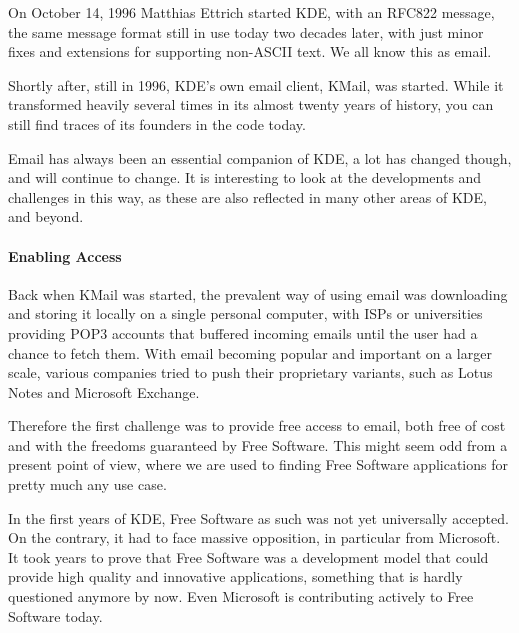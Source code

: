 

On October 14, 1996 Matthias Ettrich started KDE, with an RFC822 message, the same message format still in use today two decades later, with just minor fixes and extensions for supporting non-ASCII text. We all know this as email.

Shortly after, still in 1996, KDE's own email client, KMail, was started. While it transformed heavily several times in its almost twenty years of history, you can still find traces of its founders in the code today.

Email has always been an essential companion of KDE, a lot has changed though, and will continue to change. It is interesting to look at the developments and challenges in this way, as these are also reflected in many other areas of KDE, and beyond.

\paragraph{Enabling Access}

Back when KMail was started, the prevalent way of using email was downloading and storing it locally on a single personal computer, with ISPs or universities providing POP3 accounts that buffered incoming emails until the user had a chance to fetch them. With email becoming popular and important on a larger scale, various companies tried to push their proprietary variants, such as Lotus Notes and Microsoft Exchange.

Therefore the first challenge was to provide free access to email, both free of cost and with the freedoms guaranteed by Free Software. This might seem odd from a present point of view, where we are used to finding Free Software applications for pretty much any use case.

In the first years of KDE, Free Software as such was not yet universally accepted. On the contrary, it had to face massive opposition, in particular from Microsoft. It took years to prove that Free Software was a development model that could provide high quality and innovative applications, something that is hardly questioned anymore by now. Even Microsoft is contributing actively to Free Software today.

